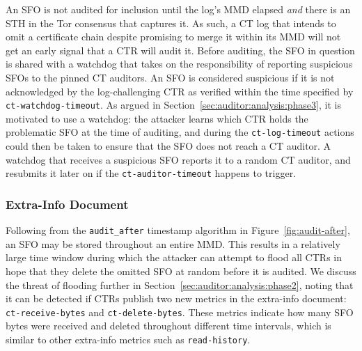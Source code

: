 An SFO is not audited for inclusion until the log's MMD elapsed \emph{and} there
is an STH in the Tor consensus that captures it.  As such, a CT log that intends
to omit a certificate chain despite promising to merge it within its MMD will
not get an early signal that a CTR will audit it.
Before auditing, the SFO in question is shared with a watchdog that takes on
the responsibility of reporting suspicious SFOs to the pinned CT auditors.
An SFO is considered suspicious if it is not acknowledged by the log-challenging
CTR as verified within the time specified by \texttt{ct-watchdog-timeout}.  As
argued in Section~\ref{sec:auditor:analysis:phase3}, it is motivated to use a
watchdog:
	the attacker learns which CTR holds the problematic SFO at the time of
		auditing, and
	during the \texttt{ct-log-timeout} actions could then be taken to ensure
		that the SFO does not reach a CT auditor.
A watchdog that receives a suspicious SFO reports it to a random CT auditor,
and resubmits it later on if the \texttt{ct-auditor-timeout} happens to trigger.

\subsubsection{Extra-Info Document} \label{sec:auditor:extra-info}
Following from the \texttt{audit\_after} timestamp algorithm in
Figure~\ref{fig:audit-after}, an SFO may be stored throughout an entire MMD.
This results in a relatively large time window during which the attacker can
attempt to flood all CTRs in hope that they delete the omitted SFO at random
before it is audited.  We discuss the threat of flooding further in
Section~\ref{sec:auditor:analysis:phase2}, noting that it can be detected if
CTRs publish two new metrics in the extra-info document:
	\texttt{ct-receive-bytes} and
	\texttt{ct-delete-bytes}.
These metrics indicate how many SFO bytes were received and deleted throughout
different time intervals, which is similar to other extra-info metrics such
as \texttt{read-history}.

